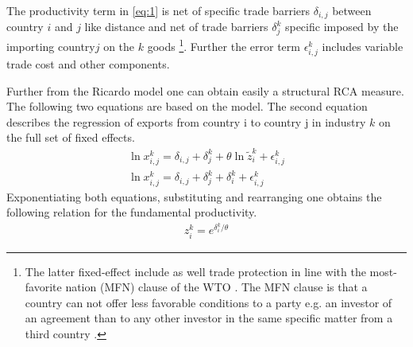 The productivity term in \cref{eq:1} is net of specific trade barriers $\delta_{i,j}$ between country $i$ and $j$ like distance and net of trade barriers $\delta_j^k$ specific imposed by the importing country$j$ on the $k$ goods \footnote{The latter fixed-effect include as well  trade protection in line with the most-favorite nation (MFN) clause of the WTO \parencite{costinot}. The MFN clause is that a country can not offer less favorable conditions to a party e.g. an investor of an agreement than to any other investor in the same specific matter from a third country  \parencite{oecd-mfn}.}. Further the error term $\epsilon^k_{i,j}$ includes variable trade cost and other components. \par
Further from the Ricardo model one can obtain easily a structural RCA measure. The following two equations are based on the model. The second equation describes the regression of exports from country i to country j in industry $k$ on the full set of fixed effects.
   \begin{align} \label{eq:2}\ln {x}_{i,j}^k=\delta_{i,j}+\delta_j^k + \theta \ln\tilde{z}_i^k
+\epsilon^k_{i,j} \\
\ln {x}_{i,j}^k=\delta_{i,j}+\delta_j^k + \delta_i^k + \epsilon^k_{i,j}
 \end{align}
Exponentiating both equations, substituting and rearranging one obtains the following relation for the fundamental productivity.
 \begin{align*} 
  z^k_i=e^{{\delta_i^ k}/{\theta}} 
  \end{align*}
